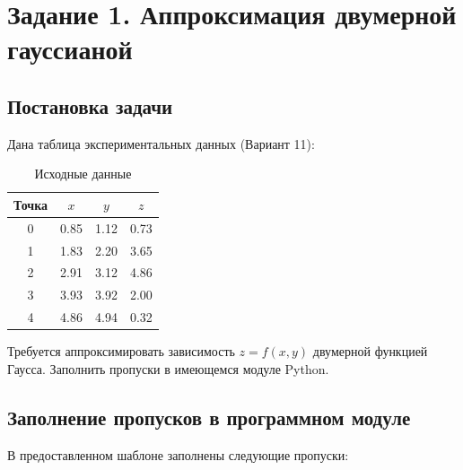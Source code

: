 \section{Задание 1. Аппроксимация двумерной гауссианой}

\subsection{Постановка задачи}

Дана таблица экспериментальных данных (Вариант 11):

\begin{table}[H]
    \centering
    \caption{Исходные данные}
    \label{tab:data}
    \begin{tabular}{|c|c|c|c|}
        \hline
        \textbf{Точка} & \textbf{$x$} & \textbf{$y$} & \textbf{$z$} \\
        \hline
        0 & 0.85 & 1.12 & 0.73 \\
        1 & 1.83 & 2.20 & 3.65 \\
        2 & 2.91 & 3.12 & 4.86 \\
        3 & 3.93 & 3.92 & 2.00 \\
        4 & 4.86 & 4.94 & 0.32 \\
        \hline
    \end{tabular}
\end{table}

Требуется аппроксимировать зависимость $z = f(x, y)$ двумерной функцией Гаусса. Заполнить пропуски в имеющемся модуле Python.

\subsection{Заполнение пропусков в программном модуле}

В предоставленном шаблоне заполнены следующие пропуски:

